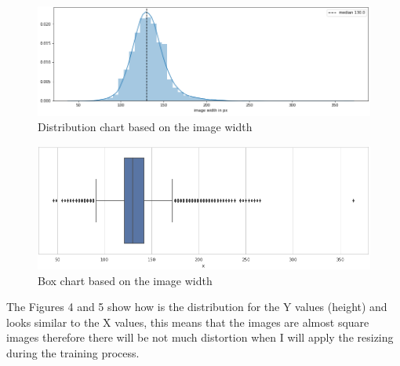 \documentclass[a4paper]{article}
\begin{document}
	
	\begin{figure}[H]
		\centering
		\includegraphics[width=.9\textwidth]{dist_x.png}
		\caption{Distribution chart based on the image width}
		\label{fig:width_dist}
	\end{figure}
	\begin{figure}[H]
		\includegraphics[width=.9\textwidth]{box_x.png}
		\caption{Box chart based on the image width}
		\label{fig:width_box}
	\end{figure}

	\medskip
	The Figures 4 and 5 show how is the distribution for the  Y values (height) and looks similar to the X values, this means that the images are almost square images therefore there will be not much distortion when I will apply the resizing during the training process.
	
\end{document}

